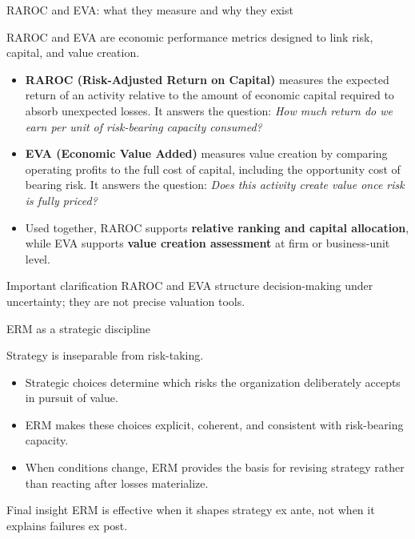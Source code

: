 \documentclass[aspectratio=169, 10pt]{beamer} %
\begin{document}
\begin{frame}{RAROC and EVA: what they measure and why they exist}

RAROC and EVA are economic performance metrics designed to link
risk, capital, and value creation.

\medskip

\begin{itemize}
  \item[$\bullet$] \textbf{RAROC (Risk-Adjusted Return on Capital)} measures
  the expected return of an activity relative to the amount of economic capital
  required to absorb unexpected losses. It answers the question:
  \emph{How much return do we earn per unit of risk-bearing capacity consumed?}

  \item[$\bullet$] \textbf{EVA (Economic Value Added)} measures value creation
  by comparing operating profits to the full cost of capital, including the
  opportunity cost of bearing risk. It answers the question:
  \emph{Does this activity create value once risk is fully priced?}

  \item[$\bullet$] Used together, RAROC supports \textbf{relative ranking and
  capital allocation}, while EVA supports \textbf{value creation assessment}
  at firm or business-unit level.
\end{itemize}

\begin{block}{Important clarification}
RAROC and EVA structure decision-making under uncertainty; they are not
precise valuation tools.
\end{block}


\end{frame}

\begin{frame}{ERM as a strategic discipline}

Strategy is inseparable from risk-taking.

\medskip

\begin{itemize}
  \item[$\bullet$] Strategic choices determine which risks the organization
  deliberately accepts in pursuit of value.

  \item[$\bullet$] ERM makes these choices explicit, coherent, and consistent
  with risk-bearing capacity.

  \item[$\bullet$] When conditions change, ERM provides the basis for revising
  strategy rather than reacting after losses materialize.
\end{itemize}

\begin{block}{Final insight}
ERM is effective when it shapes strategy ex ante, not when it explains
failures ex post.
\end{block}

\end{frame}
\end{document}
